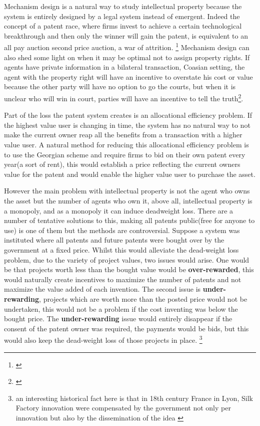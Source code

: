 \documentclass[12pt]{article}
\numberwithin{equation}{section}
\begin{document}
Mechanism design is a natural way to study intellectual property because the system is entirely designed by a legal system instead of emergent. Indeed the concept of a patent race, where firms invest to achieve a certain technological breakthrough and then only the winner will gain the patent, is equivalent to an all pay auction second price auction, a war of attrition. \footnote{ \cite{Games2003} } Mechanism design can also shed some light on when it may be optimal not to assign property rights. If agents have private information in a bilateral transaction, Coasian setting, the agent with the property right will have an incentive to overstate his cost or value because the other party will have no option to go the courts, but when it is unclear who will win in court, parties will have an incentive to tell the truth\footnote{\cite{schmitz2001coase}}.

Part of the loss the patent system creates is an allocational efficiency problem. If the highest value user is changing in time, the system has no natural way to not make the current owner reap all the benefits from a transaction with a higher value user. A natural method for reducing this allocational efficiency problem is to use the Georgian scheme and require firms to bid on their own patent every year(a sort of rent), this would establish a price reflecting the current owners value for the patent and would enable the higher value user to purchase the asset.

However the main problem with intellectual property is not the agent who owns the asset but the number of agents who own it, above all, intellectual property is a monopoly, and as a monopoly it can induce deadweight loss. There are a number of tentative solutions to this, making all patents public(free for anyone to use) is one of them but the methods are controversial. Suppose a system was instituted where all patents and future patents were bought over by the government at a fixed price. Whilst this would alleviate the dead-weight loss problem, due to the variety of project values, two issues would arise. One would be that projects worth less than the bought value would be \textbf{over-rewarded}, this would naturally create incentives to maximize the number of patents and not maximize the value added of each invention. The second issue is \textbf{under-rewarding}, projects which are worth more than the posted price would not be undertaken, this would not be a problem if the cost inventing was below the bought price. The \textbf{under-rewarding} issue would entirely disappear if the consent of the patent owner was required, the payments would be bids, but this would also keep the dead-weight loss of those projects in place. \footnote{an interesting historical fact here is that in 18th century France in Lyon, Silk Factory innovation were compensated by the government not only per innovation but also by the dissemination of the idea \cite{foray2013patent}}
\end{document}

